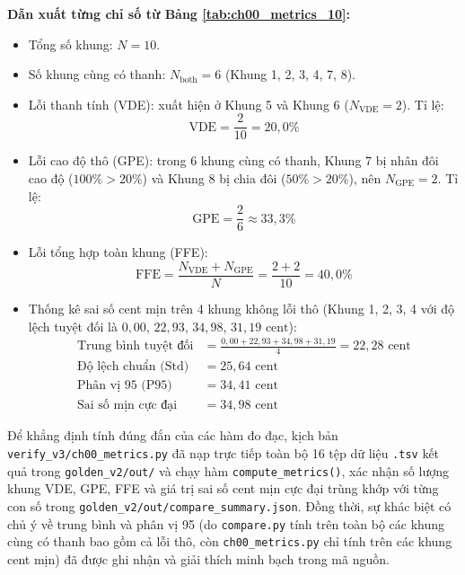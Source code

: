 \textbf{Dẫn xuất từng chỉ số từ Bảng \ref{tab:ch00_metrics_10}:}
\begin{itemize}[leftmargin=1.5em, itemsep=2pt]
    \item Tổng số khung: $N = 10$.
    \item Số khung cùng có thanh: $N_{\text{both}} = 6$ (Khung 1, 2, 3, 4, 7, 8).
    \item Lỗi thanh tính (VDE): xuất hiện ở Khung 5 và Khung 6 ($N_{\text{VDE}} = 2$). Tỉ lệ:
    \begin{equation}
    \text{VDE} = \frac{2}{10} = 20{,}0\%
    \end{equation}
    \item Lỗi cao độ thô (GPE): trong 6 khung cùng có thanh, Khung 7 bị nhân đôi cao độ ($100\% > 20\%$) và Khung 8 bị chia đôi ($50\% > 20\%$), nên $N_{\text{GPE}} = 2$. Tỉ lệ:
    \begin{equation}
    \text{GPE} = \frac{2}{6} \approx 33{,}3\%
    \end{equation}
    \item Lỗi tổng hợp toàn khung (FFE):
    \begin{equation}
    \text{FFE} = \frac{N_{\text{VDE}} + N_{\text{GPE}}}{N} = \frac{2 + 2}{10} = 40{,}0\%
    \end{equation}
    \item Thống kê sai số cent mịn trên 4 khung không lỗi thô (Khung 1, 2, 3, 4 với độ lệch tuyệt đối là $0{,}00$, $22{,}93$, $34{,}98$, $31{,}19\text{ cent}$):
    \begin{align}
    \text{Trung bình tuyệt đối} &= \frac{0{,}00 + 22{,}93 + 34{,}98 + 31{,}19}{4} = 22{,}28\text{ cent} \\
    \text{Độ lệch chuẩn (Std)} &= 25{,}64\text{ cent} \\
    \text{Phân vị 95 (P95)} &= 34{,}41\text{ cent} \\
    \text{Sai số mịn cực đại} &= 34{,}98\text{ cent}
    \end{align}
\end{itemize}
Để khẳng định tính đúng đắn của các hàm đo đạc, kịch bản \texttt{verify\_v3/ch00\_metrics.py} đã nạp trực tiếp toàn bộ 16 tệp dữ liệu \texttt{.tsv} kết quả trong \texttt{golden\_v2/out/} và chạy hàm \texttt{compute\_metrics()}, xác nhận số lượng khung VDE, GPE, FFE và giá trị sai số cent mịn cực đại trùng khớp với từng con số trong \texttt{golden\_v2/out/compare\_summary.json}. Đồng thời, sự khác biệt có chủ ý về trung bình và phân vị 95 (do \texttt{compare.py} tính trên toàn bộ các khung cùng có thanh bao gồm cả lỗi thô, còn \texttt{ch00\_metrics.py} chỉ tính trên các khung cent mịn) đã được ghi nhận và giải thích minh bạch trong mã nguồn.

